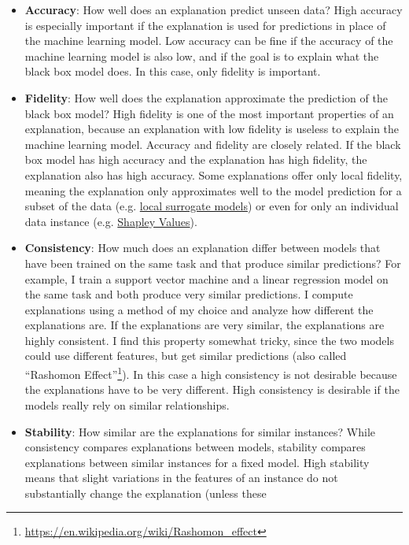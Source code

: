 \documentclass[12pt,]{krantz}
\providecommand{\tightlist}{%
  \setlength{\itemsep}{0pt}\setlength{\parskip}{0pt}}
\renewcommand{\href}[2]{#2\footnote{\url{#1}}}
\begin{document}
\begin{itemize}
\tightlist
\item
  \textbf{Accuracy}: How well does an explanation predict unseen data?
  High accuracy is especially important if the explanation is used for
  predictions in place of the machine learning model. Low accuracy can
  be fine if the accuracy of the machine learning model is also low, and
  if the goal is to explain what the black box model does. In this case,
  only fidelity is important.
\item
  \textbf{Fidelity}: How well does the explanation approximate the
  prediction of the black box model? High fidelity is one of the most
  important properties of an explanation, because an explanation with
  low fidelity is useless to explain the machine learning model.
  Accuracy and fidelity are closely related. If the black box model has
  high accuracy and the explanation has high fidelity, the explanation
  also has high accuracy. Some explanations offer only local fidelity,
  meaning the explanation only approximates well to the model prediction
  for a subset of the data (e.g. \protect\hyperlink{lime}{local
  surrogate models}) or even for only an individual data instance (e.g.
  \protect\hyperlink{shapley}{Shapley Values}).
\item
  \textbf{Consistency}: How much does an explanation differ between
  models that have been trained on the same task and that produce
  similar predictions? For example, I train a support vector machine and
  a linear regression model on the same task and both produce very
  similar predictions. I compute explanations using a method of my
  choice and analyze how different the explanations are. If the
  explanations are very similar, the explanations are highly consistent.
  I find this property somewhat tricky, since the two models could use
  different features, but get similar predictions (also called
  \href{https://en.wikipedia.org/wiki/Rashomon_effect}{``Rashomon
  Effect''}). In this case a high consistency is not desirable because
  the explanations have to be very different. High consistency is
  desirable if the models really rely on similar relationships.
\item
  \textbf{Stability}: How similar are the explanations for similar
  instances? While consistency compares explanations between models,
  stability compares explanations between similar instances for a fixed
  model. High stability means that slight variations in the features of
  an instance do not substantially change the explanation (unless these

\end{itemize}
\end{document}
